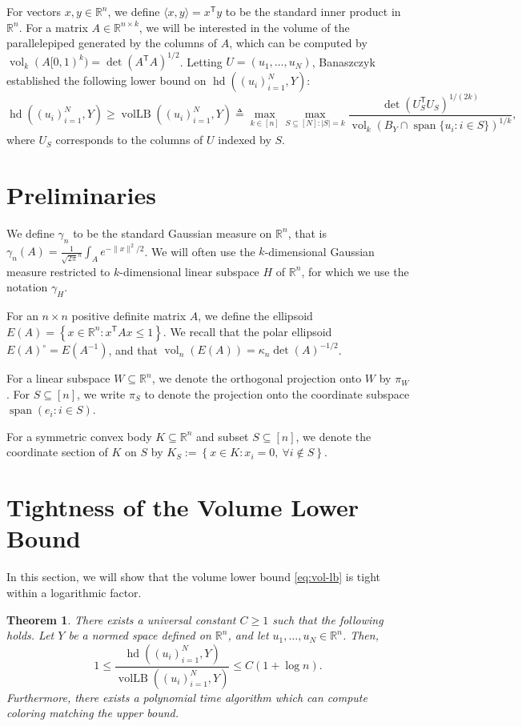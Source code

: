 \documentclass[12pt]{article}
\newtheorem{theorem}{Theorem}
\newcommand{\R}{{\mathbb{R}}}
\newcommand{\T}{\mathsf T}
\newcommand{\eqdef}{\triangleq}
\newcommand{\inner}[2]{\langle #1, #2 \rangle}
\newcommand{\set}[1]{\left\{ #1 \right\}}
\DeclareMathOperator{\vollb}{volLB}
\DeclareMathOperator{\hd}{hd}
\DeclareMathOperator{\vol}{vol}
\DeclareMathOperator{\lspan}{span}
\begin{document}
For vectors $x,y \in \R^n$, we define $\inner{x}{y} = x^\T y$ to be the standard
inner product in $\R^n$. For a matrix $A \in \R^{n \times k}$, we will be
interested in the volume of the parallelepiped generated by the columns of $A$,
which can be computed by $\vol_k(A[0,1)^k) = \det(A^\T A)^{1/2}$.  Letting $U =
(u_1,\dots,u_N)$, Banaszczyk~\cite{Bana93} established the following lower bound
on $\hd((u_i)_{i = 1}^N, Y)$:
\begin{equation}
  \label{eq:vol-lb}
  \hd((u_i)_{i = 1}^N, Y) \ge \vollb((u_i)_{i = 1}^N, Y) \eqdef
  \max_{k \in [n]} \max_{S \subseteq [N]: |S| = k}
\frac{\det(U_S^\T U_S)^{1/(2k)}}{\vol_{k}(B_Y \cap
\lspan\{u_i: i \in S\})^{1/k}},
\end{equation}
where $U_S$ corresponds to the columns of $U$ indexed by $S$.

\section{Preliminaries}

We define $\gamma_n$ to be the standard Gaussian measure on $\R^n$, that is
$\gamma_n(A) = \frac{1}{\sqrt{2\pi}^n} \int_A e^{-\|x\|^2/2}$. We will often use
the $k$-dimensional Gaussian measure restricted to $k$-dimensional linear
subspace $H$ of $\R^n$, for which we use the notation $\gamma_H$.

For an $n \times n$ positive definite matrix $A$, we define the ellipsoid $E(A)
= \set{x \in \R^n: x^\T A x \leq 1}$. We recall that the polar ellipsoid
$E(A)^\circ = E(A^{-1})$, and that $\vol_n(E(A)) = \kappa_n \det(A)^{-1/2}$.

For a linear subspace $W \subseteq \R^n$, we denote the orthogonal projection
onto $W$ by $\pi_W$. For $S \subseteq [n]$, we write $\pi_S$ to denote the
projection onto the coordinate subspace $\lspan(e_i: i \in S)$.

For a symmetric convex body $K \subseteq \R^n$ and subset $S \subseteq [n]$, we
denote the coordinate section of $K$ on $S$ by $K_S := \set{x \in K: x_i = 0,
~\forall i \notin S}$.

\section{Tightness of the Volume Lower Bound}

In this section, we will show that the volume lower bound \eqref{eq:vol-lb} is
tight within a logarithmic factor. 

\begin{theorem}\label{thm:tightness}
There exists a universal constant $C \geq 1$ such that the following
holds. Let $Y$ be a normed space defined on $\R^n$, and let $u_1,
\ldots, u_N \in \R^n$. Then,
\[
1 \le \frac{\hd((u_i)_{i = 1}^N, Y)}{\vollb((u_i)_{i = 1}^N, Y) } \le C(1+\log n).
\]
Furthermore, there exists a polynomial time algorithm which can compute coloring
matching the upper bound. 
\end{theorem}
\end{document}

